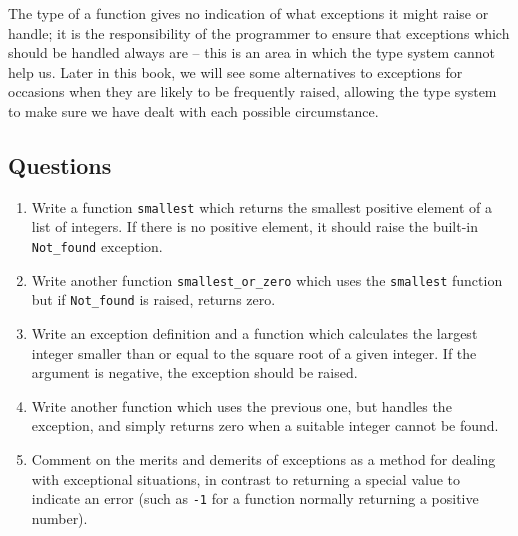 \documentclass[]{book}
\begin{document}
\noindent  The type of a function gives no indication of what exceptions it might raise or handle; it is the responsibility of the programmer to ensure that exceptions which should be handled always are -- this is an area in which the type system cannot help us. Later in this book, we will see some alternatives to exceptions for occasions when they are likely to be frequently raised, allowing the type system to make sure we have dealt with each possible circumstance.

\clearpage
\section*{Questions}

\begin{enumerate}
\item Write a function \texttt{smallest} which returns the smallest positive element of a list of integers. If there is no positive element, it should raise the built-in \texttt{Not\_found} exception.

\item Write another function \texttt{smallest\_or\_zero} which uses the \texttt{smallest} function but if \texttt{Not\_found} is raised, returns zero.

\item Write an exception definition and a function which calculates the largest integer smaller than or equal to the square root of a given integer. If the argument is negative, the exception should be raised.

\item Write another function which uses the previous one, but handles the exception, and simply returns zero when a suitable integer cannot be found.

\item Comment on the merits and demerits of exceptions as a method for dealing with exceptional situations, in contrast to returning a special value to indicate an error (such as \texttt{-1} for a function normally returning a positive number).

\end{enumerate}

\cleardoublepage
\thispagestyle{empty}
\chapter*{}
\\
\end{document}
